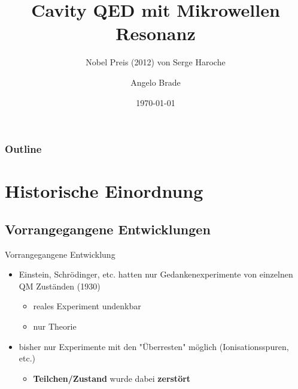 \documentclass{beamer}
\title{Cavity QED mit Mikrowellen Resonanz}
\subtitle{Nobel Preis (2012) von Serge Haroche}
\author{Angelo Brade}
\institute{University of Bonn}
\date{\today}
\begin{document}
\begin{frame}
	\titlepage
\end{frame}
\begin{frame}
	\frametitle{Outline}
	\tableofcontents
\end{frame}

\section{Historische Einordnung}
\subsection{Vorrangegangene Entwicklungen}
\begin{frame}{Vorrangegangene Entwicklung}
	\begin{itemize}
		\item Einstein, Schrödinger, etc. hatten nur Gedankenexperimente von einzelnen QM Zuständen (1930)
		      \begin{itemize}
			      \item reales Experiment undenkbar
			      \item nur Theorie
		      \end{itemize}
		\item bisher nur Experimente mit den "Überresten" möglich (Ionisationsspuren, etc.)
		      \begin{itemize}
			      \item \textbf{Teilchen/Zustand} wurde dabei \textbf{zerstört}
		      \end{itemize}
	\end{itemize}
\end{frame}
\end{document}
